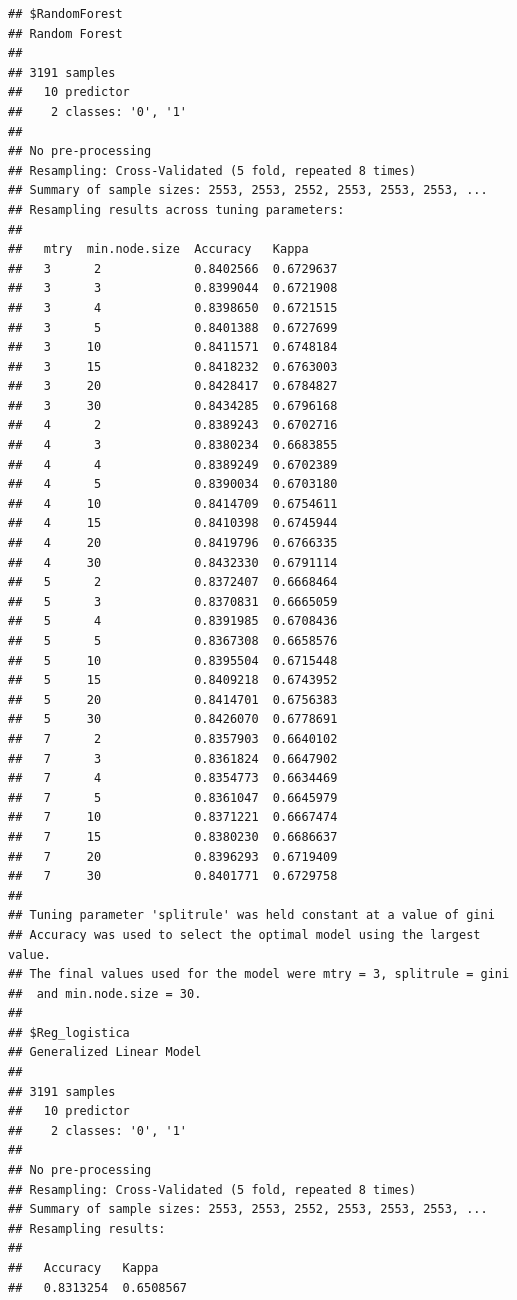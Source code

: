 \documentclass[]{article}
\begin{document}
\begin{lstlisting}
## $RandomForest
## Random Forest 
## 
## 3191 samples
##   10 predictor
##    2 classes: '0', '1' 
## 
## No pre-processing
## Resampling: Cross-Validated (5 fold, repeated 8 times) 
## Summary of sample sizes: 2553, 2553, 2552, 2553, 2553, 2553, ... 
## Resampling results across tuning parameters:
## 
##   mtry  min.node.size  Accuracy   Kappa    
##   3      2             0.8402566  0.6729637
##   3      3             0.8399044  0.6721908
##   3      4             0.8398650  0.6721515
##   3      5             0.8401388  0.6727699
##   3     10             0.8411571  0.6748184
##   3     15             0.8418232  0.6763003
##   3     20             0.8428417  0.6784827
##   3     30             0.8434285  0.6796168
##   4      2             0.8389243  0.6702716
##   4      3             0.8380234  0.6683855
##   4      4             0.8389249  0.6702389
##   4      5             0.8390034  0.6703180
##   4     10             0.8414709  0.6754611
##   4     15             0.8410398  0.6745944
##   4     20             0.8419796  0.6766335
##   4     30             0.8432330  0.6791114
##   5      2             0.8372407  0.6668464
##   5      3             0.8370831  0.6665059
##   5      4             0.8391985  0.6708436
##   5      5             0.8367308  0.6658576
##   5     10             0.8395504  0.6715448
##   5     15             0.8409218  0.6743952
##   5     20             0.8414701  0.6756383
##   5     30             0.8426070  0.6778691
##   7      2             0.8357903  0.6640102
##   7      3             0.8361824  0.6647902
##   7      4             0.8354773  0.6634469
##   7      5             0.8361047  0.6645979
##   7     10             0.8371221  0.6667474
##   7     15             0.8380230  0.6686637
##   7     20             0.8396293  0.6719409
##   7     30             0.8401771  0.6729758
## 
## Tuning parameter 'splitrule' was held constant at a value of gini
## Accuracy was used to select the optimal model using the largest value.
## The final values used for the model were mtry = 3, splitrule = gini
##  and min.node.size = 30.
## 
## $Reg_logistica
## Generalized Linear Model 
## 
## 3191 samples
##   10 predictor
##    2 classes: '0', '1' 
## 
## No pre-processing
## Resampling: Cross-Validated (5 fold, repeated 8 times) 
## Summary of sample sizes: 2553, 2553, 2552, 2553, 2553, 2553, ... 
## Resampling results:
## 
##   Accuracy   Kappa    
##   0.8313254  0.6508567
\end{lstlisting}
\end{document}
